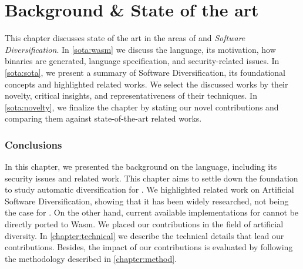 \chapter{Background \& State of the art}
\label{chapter:sota}

This chapter discusses state of the art in the areas of \emph{\wasm} and \emph{Software Diversification}. In \autoref{sota:wasm} we discuss the \wasm language, its motivation, how \wasm binaries are generated, language specification, and security-related issues. In \autoref{sota:sota}, we present a summary of Software Diversification, its foundational concepts and highlighted related works.  
We select the discussed works by their novelty, critical insights, and representativeness of their techniques. 
In \autoref{sota:novelty}, we finalize the chapter by stating our novel contributions and comparing them against state-of-the-art related works.







\subsection*{Conclusions}
In this chapter, we presented the background on the \wasm language, including its security issues and related work.
This chapter aims to settle down the foundation to study automatic diversification for \wasm. 
We highlighted related work on Artificial Software Diversification, showing that it has been widely researched, not being the case for \wasm. 
On the other hand, current available implementations for cannot be directly ported to Wasm. 
We placed our contributions in the field of artificial diversity. 
In \autoref{chapter:technical} we describe the technical details that lead our contributions. 
Besides, the impact of our contributions is evaluated by following the methodology described in \autoref{chapter:method}.
